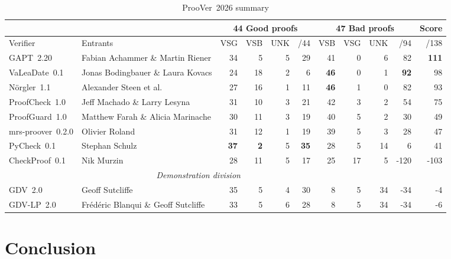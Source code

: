 \documentclass[aic]{iosart2x}
\newcommand{\bb}[1]{\bf {#1}}
\begin{document}
\begin{table}[tbhp]
\caption{ProoVer~2026 summary}
\label{ProoVerSummary}
\begin{tabular}{ll|rrrr|rrrr|r}
\hline
                  &          
    &\multicolumn{4}{c|}{44 Good proofs}& \multicolumn{4}{c|}{47 Bad proofs} & Score \\
 \hline
Verifier          & Entrants 
    & VSG & VSB & UNK &   /44 & VSB & VSG & UNK & /94 & /138 \\
\hline
GAPT~2.20         & Fabian Achammer \& Martin Riener 
    &  34 &   5 &   5 &    29 &  41 &   0 &   6 &  82 &  \bb{111} \\
VaLeaDate~0.1     & Jonas Bodingbauer \& Laura Kovacs 
    &  24 &  18 &   2 &     6 &  \bb{46} &   0 &   1 &  \bb{92} &   98 \\
N\"orgler~1.1     & Alexander Steen et al.            
    &  27 &  16 &   1 &    11 &  \bb{46} &   1 &   0 &  82 &   93 \\
ProofCheck~1.0    & Jeff Machado \& Larry Lesyna     
    &  31 &  10 &   3 &    21 &  42 &   3 &   2 &  54 &   75 \\
ProofGuard~1.0    & Matthew Farah \& Alicia Marinache 
    &  30 &  11 &   3 &    19 &  40 &   5 &   2 &  30 &   49 \\
mrs-proover~0.2.0 & Olivier Roland
    &  31 &  12 &   1 &    19 &  39 &   5 &   3 &  28 &   47 \\
PyCheck~0.1       & Stephan Schulz                    
    &  \bb{37} &   \bb{2} &   5 &    \bb{35} &  28 &   5 &  14 &   6 &   41 \\
CheckProof~0.1    & Nik Murzin
    &  28 &  11 &   5 &    17 &  25 &  17 &   5 &-120 & -103 \\
\hline
\multicolumn{9}{c}{\textit{Demonstration division}} \\
\hline
GDV~2.0           & Geoff Sutcliffe
    &  35 &   5 &   4 &    30 &   8 &   5 &  34 & -34 &   -4 \\
GDV-LP~2.0        & Fr\'ed\'eric Blanqui \& Geoff Sutcliffe
    &  33 &   5 &   6 &    28 &   8 &   5 &  34 & -34 &   -6 \\
\hline
\end{tabular}
\end{table}


\section{Conclusion}
\label{Conclusion}
\end{document}
